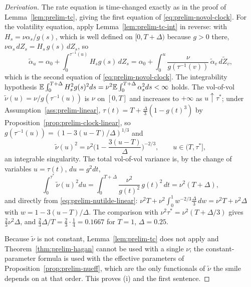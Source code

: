\documentclass[../../../main.tex]{subfiles}
\begin{document}
\begin{proof}[Derivation]
The rate equation is time-changed exactly as in the proof of Lemma~\ref{lem:prelim-tc}, giving the first equation of \eqref{eq:prelim-novol-clock}. For the volatility equation, apply Lemma~\ref{lem:prelim-tc-int} in reverse: with $H_s=\nu\alpha_s/g(s)$, which is well defined on $[0,T+\Delta)$ because $g>0$ there, $\nu\alpha_s\,dZ_s=H_s\,g(s)\,dZ_s$, so
\[
\tilde\alpha_u=\alpha_0+\int_0^{\tau^{-1}(u)}H_sg(s)\,dZ_s=\alpha_0+\int_0^u\frac{\nu}{g(\tau^{-1}(v))}\,\tilde\alpha_v\,d\tilde Z_v ,
\]
which is the second equation of \eqref{eq:prelim-novol-clock}. The integrability hypothesis $\mathbb{E}\int_0^{T+\Delta}H_s^2g(s)^2ds=\nu^2\mathbb{E}\int_0^{T+\Delta}\alpha_s^2ds<\infty$ holds. The vol-of-vol $\tilde\nu(u)=\nu/g(\tau^{-1}(u))$ is $\nu$ on $[0,T]$ and increases to $+\infty$ as $u\uparrow\tau^*$; under Assumption~\ref{ass:prelim-linear}, $\tau(t)=T+\tfrac\Delta3(1-g(t)^3)$ by Proposition~\ref{prop:prelim-clock-linear}, so $g(\tau^{-1}(u))=(1-3(u-T)/\Delta)^{1/3}$ and
\begin{equation}\label{eq:prelim-nutilde-linear}
\tilde\nu(u)^2=\nu^2\Big(1-\frac{3(u-T)}{\Delta}\Big)^{-2/3},\qquad u\in(T,\tau^*],
\end{equation}
an integrable singularity. The total vol-of-vol variance is, by the change of variables $u=\tau(t)$, $du=g^2dt$,
\[
\int_0^{\tau^*}\tilde\nu(u)^2du=\int_0^{T+\Delta}\frac{\nu^2}{g(t)^2}\,g(t)^2\,dt=\nu^2(T+\Delta),
\]
and directly from \eqref{eq:prelim-nutilde-linear}: $\nu^2T+\nu^2\int_0^1w^{-2/3}\tfrac\Delta3\,dw=\nu^2T+\nu^2\Delta$ with $w=1-3(u-T)/\Delta$. The comparison with $\nu^2\tau^*=\nu^2(T+\Delta/3)$ gives $\tfrac23\nu^2\Delta$, and $\tfrac23\Delta/T=\tfrac23\cdot\tfrac14=0.1667$ for $T=1$, $\Delta=0.25$.

Because $\tilde\nu$ is not constant, Lemma~\ref{lem:prelim-tc} does not apply and Theorem~\ref{thm:prelim-hagan} cannot be used with a single $\nu$; the constant-parameter formula is used with the effective parameters of Proposition~\ref{prop:prelim-nueff}, which are the only functionals of $\tilde\nu$ the smile depends on at that order. This proves (i) and the first sentence.


\end{proof}
\end{document}
